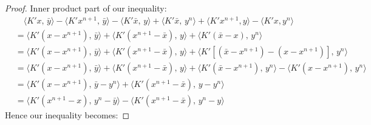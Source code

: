 \documentclass[twoside,12pt,openright]{report}  %
\begin{document}
\begin{proof}
Inner product part of our inequality:
\[
\begin{aligned}
    &\quad \langle K' x,\, \bar{y} \rangle - \langle K' x^{n+1},\, \bar{y} \rangle - \langle K' \bar{x},\, y \rangle + \langle K' \bar{x},\, y^{n} \rangle + \langle K'x^{n+1},y\rangle - \langle K'x,y^{n}\rangle \\
    &= \langle K' (x-x^{n+1}),\, \bar{y} \rangle + \langle K' (x^{n+1}-\bar{x}),\, y \rangle + \langle K' (\bar{x}-x),\, y^{n} \rangle\\
    &= \langle K' (x-x^{n+1}),\, \bar{y} \rangle + \langle K' (x^{n+1}-\bar{x}),\, y \rangle + \langle K' [(\bar{x} - x^{n+1})-(x-x^{n+1})],\, y^{n} \rangle\\
    &= \langle K' (x-x^{n+1}),\, \bar{y} \rangle + \langle K' (x^{n+1}-\bar{x}),\, y \rangle + \langle K' (\bar{x} - x^{n+1}),\, y^{n} \rangle - \langle K'(x-x^{n+1}),\, y^{n} \rangle\\
    &= \langle K' (x-x^{n+1}),\, \bar{y} -y^{n} \rangle + \langle K' (x^{n+1}-\bar{x}),\, y -y^{n} \rangle\\
    &= \langle K' (x^{n+1} - x),\, y^{n} - \bar{y}\rangle - \langle K' (x^{n+1}-\bar{x}),\,y^{n} -y \rangle
\end{aligned}
\]
Hence our inequality becomes:



\end{proof}
\end{document}
